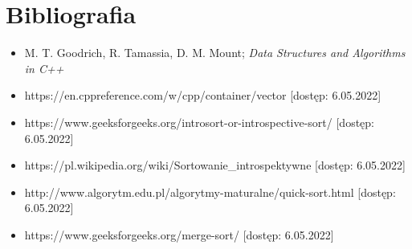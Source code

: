 \documentclass[12pt]{article}
\begin{document}
\begin{enumerate}
\end{enumerate}


\section{Bibliografia}
\begin{itemize}
    \item M. T. Goodrich, R. Tamassia, D. M. Mount; \textit{Data Structures and Algorithms in C++}
    \item https://en.cppreference.com/w/cpp/container/vector [dostęp: 6.05.2022]
    \item https://www.geeksforgeeks.org/introsort-or-introspective-sort/ [dostęp: 6.05.2022]
    \item https://pl.wikipedia.org/wiki/Sortowanie\_introspektywne [dostęp: 6.05.2022]
    \item http://www.algorytm.edu.pl/algorytmy-maturalne/quick-sort.html [dostęp: 6.05.2022]
    \item https://www.geeksforgeeks.org/merge-sort/ [dostęp: 6.05.2022]
\end{itemize}
\end{document}
